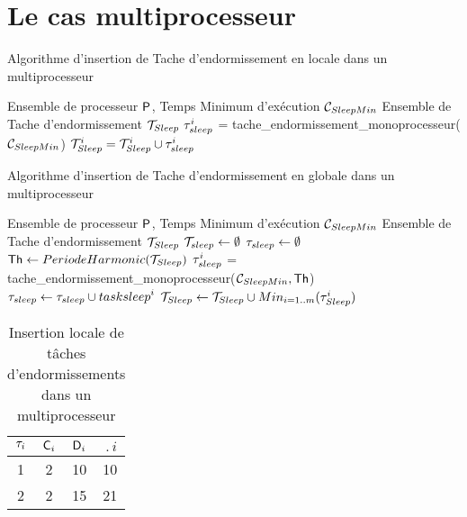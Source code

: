 

\section{Le cas multiprocesseur}

\begin{algorithm}
\caption{Algorithme d'insertion de Tache d'endormissement en locale dans un multiprocesseur}
\label{edfmpl}
\begin{algorithmic}
\State Ensemble de processeur $\mathsf{P}_{}$, Temps Minimum d'exécution $\mathcal{C}_{SleepMin}$
\State Ensemble de Tache d'endormissement $\mathcal{T}_{Sleep}$
\State $\tau_{sleep}^i$ = tache\_endormissement\_monoprocesseur($\mathcal{C}_{SleepMin}$) 
\State $\mathcal{T}_{Sleep}^i =\mathcal{T}_{Sleep}^i \cup \tau_{sleep}^i$
\EndFor
\end{algorithmic}
\end{algorithm}

\begin{algorithm}
\caption{Algorithme d'insertion de Tache d'endormissement en globale dans un multiprocesseur}
\label{edfmpg}
\begin{algorithmic}
\State Ensemble de processeur $\mathsf{P}_{}$, Temps Minimum d'exécution $\mathcal{C}_{SleepMin}$
\State Ensemble de Tache d'endormissement $\mathcal{T}_{Sleep}$
\State $\mathcal{T}_{sleep} \leftarrow \emptyset$
\State $\tau_{sleep} \leftarrow \emptyset$
\State $\mathsf{Th} \leftarrow PeriodeHarmonic(\mathcal{T}_{Sleep})$
\State $\tau_{sleep}^i$ = tache\_endormissement\_monoprocesseur($\mathcal{C}_{SleepMin},\mathsf{Th}$) 
\State $\tau_{sleep} \leftarrow \tau_{sleep} \cup task{sleep}^i$
\EndFor
{}
\State $\mathcal{T}_{Sleep} \leftarrow \mathcal{T}_{Sleep} \cup Min_{i =1..m}(\tau_{Sleep}^i)$
\EndFor
\end{algorithmic}
\end{algorithm}


\begin{table}[h]
\begin{center}
\begin{tabular}{|c|c|c|c|}
 \hline$\tau_{i}$ & $\mathsf{C}_{i}$ & $\mathsf{D}_{i}$ & $\period{i}$ \\ 
 \hline1 & 2 & 10 & 10 \\ 
 \hline 2 & 2 & 15 & 21 \\ 
 \hline 
 \end{tabular}
\end{center}
\caption{Insertion locale de tâches d'endormissements dans un multiprocesseur} \label{tab:edfmp}
\end{table}
